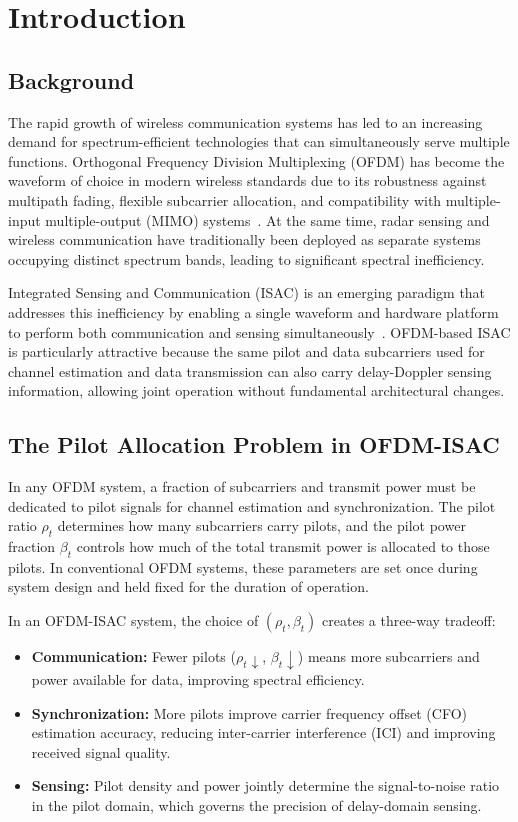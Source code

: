\chapter{Introduction}

\section{Background}

The rapid growth of wireless communication systems has led to an increasing demand for spectrum-efficient technologies that can simultaneously serve multiple functions. Orthogonal Frequency Division Multiplexing (OFDM) has become the waveform of choice in modern wireless standards due to its robustness against multipath fading, flexible subcarrier allocation, and compatibility with multiple-input multiple-output (MIMO) systems~\cite{proakis2008digital}. At the same time, radar sensing and wireless communication have traditionally been deployed as separate systems occupying distinct spectrum bands, leading to significant spectral inefficiency.

Integrated Sensing and Communication (ISAC) is an emerging paradigm that addresses this inefficiency by enabling a single waveform and hardware platform to perform both communication and sensing simultaneously~\cite{sturm2011waveform, liu2022integrated}. OFDM-based ISAC is particularly attractive because the same pilot and data subcarriers used for channel estimation and data transmission can also carry delay-Doppler sensing information, allowing joint operation without fundamental architectural changes.

\section{The Pilot Allocation Problem in OFDM-ISAC}

In any OFDM system, a fraction of subcarriers and transmit power must be dedicated to pilot signals for channel estimation and synchronization. The pilot ratio $\rho_t$ determines how many subcarriers carry pilots, and the pilot power fraction $\beta_t$ controls how much of the total transmit power is allocated to those pilots. In conventional OFDM systems, these parameters are set once during system design and held fixed for the duration of operation.

In an OFDM-ISAC system, the choice of $(\rho_t, \beta_t)$ creates a three-way tradeoff:
\begin{itemize}
    \item \textbf{Communication:} Fewer pilots ($\rho_t \downarrow$, $\beta_t \downarrow$) means more subcarriers and power available for data, improving spectral efficiency.
    \item \textbf{Synchronization:} More pilots improve carrier frequency offset (CFO) estimation accuracy, reducing inter-carrier interference (ICI) and improving received signal quality.
    \item \textbf{Sensing:} Pilot density and power jointly determine the signal-to-noise ratio in the pilot domain, which governs the precision of delay-domain sensing.
\end{itemize}

